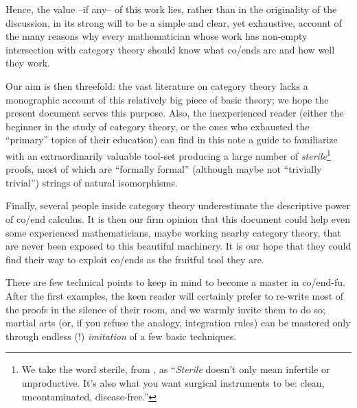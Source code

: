 Hence, the value --if any-- of this work lies, rather than in the originality of the discussion, in its strong will to be a simple and clear, yet exhaustive, account of the many reasons why every mathematician whose work has non\hyp{}empty intersection with category theory should know what co/ends are and how well they work.

Our aim is then threefold: the vast literature on category theory lacks a monographic account of this relatively big piece of basic theory; we hope the present document serves this purpose. Also, the inexperienced reader (either the beginner in the study of category theory, or the ones who exhausted the ``primary'' topics of their education) can find in this note a guide to familiarize with an extraordinarily valuable tool-set producing a large number of \emph{sterile}\footnote{We take the word sterile, from \cite{Leinster-cafe}, as ``\emph{Sterile} doesn't only mean infertile or unproductive. It's also what you want surgical instruments to be: clean, uncontaminated, disease-free.''} proofs, most of which are ``formally formal'' (although maybe not ``trivially trivial'') strings of natural isomorphisms. 

Finally, several people inside category theory underestimate the descriptive power of co/end calculus. It is then our firm opinion that this document could help even some experienced mathematicians, maybe working nearby category theory, that are never been exposed to this beautiful machinery. It is our hope that they could find their way to exploit co/ends as the fruitful tool they are.

There are few technical points to keep in mind to become a master in co/end-fu. After the first examples, the keen reader will certainly prefer to re\hyp{}write most of the proofs in the silence of their room, and we warmly invite them to do so; martial arts (or, if you refuse the analogy, integration rules) can be mastered only through endless (!) \emph{imitation} of a few basic techniques.%

